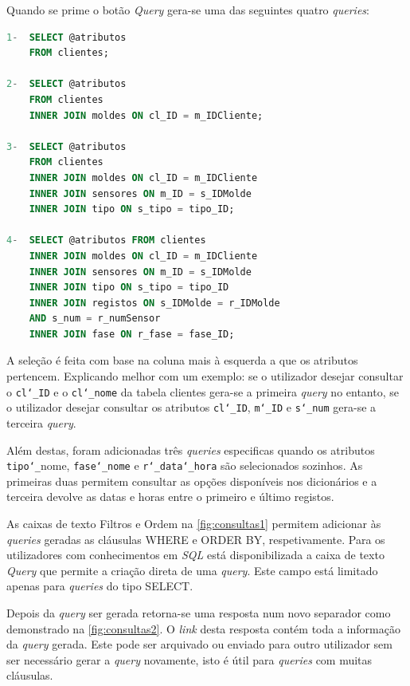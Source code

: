 \documentclass[11pt,twoside,a4paper]{report}
\begin{document}
\newpage
Quando  se prime o botão \textit{Query} gera-se uma das seguintes quatro \textit{queries}:
\begin{lstlisting}[language = SQL]
1-	SELECT @atributos
	FROM clientes;
	
2-	SELECT @atributos
	FROM clientes
	INNER JOIN moldes ON cl_ID = m_IDCliente;
	
3-	SELECT @atributos
	FROM clientes
	INNER JOIN moldes ON cl_ID = m_IDCliente
	INNER JOIN sensores ON m_ID = s_IDMolde
	INNER JOIN tipo ON s_tipo = tipo_ID;
	
4-	SELECT @atributos FROM clientes
	INNER JOIN moldes ON cl_ID = m_IDCliente
	INNER JOIN sensores ON m_ID = s_IDMolde 
	INNER JOIN tipo ON s_tipo = tipo_ID
	INNER JOIN registos ON s_IDMolde = r_IDMolde
	AND s_num = r_numSensor
	INNER JOIN fase ON r_fase = fase_ID;
\end{lstlisting}
A seleção é feita com base na coluna mais à esquerda a que os atributos pertencem. Explicando melhor com um exemplo: se o utilizador desejar consultar o \texttt{cl\char`_ID} e o \texttt{cl\char`_nome} da tabela clientes gera-se a primeira \textit{query} no entanto, se o utilizador desejar consultar os atributos \texttt{cl\char`_ID}, \texttt{m\char`_ID} e \texttt{s\char`_num} gera-se a terceira \textit{query}.\par
Além destas, foram adicionadas três \textit{queries} especificas quando os atributos \texttt{tipo\char`_}nome, \texttt{fase\char`_nome} e \texttt{r\char`_data}\texttt{\char`_hora} são selecionados sozinhos. As primeiras duas permitem consultar as opções disponíveis nos dicionários e a terceira devolve as datas e horas entre o primeiro e último registos.\par
As caixas de texto Filtros e Ordem na \autoref{fig:consultas1} permitem adicionar às \textit{queries} geradas as cláusulas WHERE e ORDER BY, respetivamente. Para os utilizadores com conhecimentos em \textit{SQL} está disponibilizada a caixa de texto \textit{Query} que permite a criação direta de uma \textit{query}. Este campo está limitado apenas para \textit{queries} do tipo SELECT.\par
Depois da \textit{query} ser gerada retorna-se uma resposta num novo separador como demonstrado na \autoref{fig:consultas2}. O \textit{link} desta resposta contém toda a informação da \textit{query} gerada. Este pode ser arquivado ou enviado para outro utilizador sem ser necessário gerar a \textit{query} novamente, isto é útil para \textit{queries} com muitas cláusulas.\par
\end{document}
